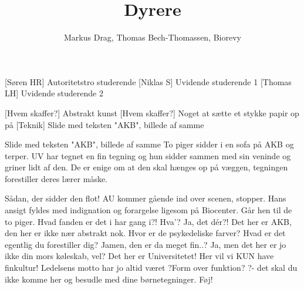 \documentclass[a4paper,12pt]{article}
\title{Dyrere}
\author{Markus Drag, Thomas Bech-Thomassen, Biorevy}
\begin{document}
\maketitle

\begin{texxers}
\end{texxers}

\begin{roles}
	[Søren HR] Autoritetstro studerende
	[Niklas S] Uvidende studerende 1
	[Thomas LH] Uvidende studerende 2
\end{roles}


\begin{props}
	[Hvem skaffer?] Abstrakt kunst
	[Hvem skaffer?] Noget at sætte et stykke papir op på
	[Teknik] Slide med teksten "AKB", billede af samme
\end{props}

\begin{sketch}
Slide med teksten "AKB", billede af samme
\scene To piger sidder i en sofa på AKB og terper. UV har tegnet en fin tegning og hun sidder sammen med sin veninde og griner lidt af den. De er enige om at den skal hænges op på væggen, tegningen forestiller deres lærer måske.



Sådan, der sidder den flot!
\scene AU kommer gående ind over scenen, stopper. Hans ansigt fyldes med indignation og forargelse ligesom på Biocenter. Går hen til de to piger.
 Hvad fanden er det i har gang i?!
Hva'?
 Ja, det dér?! Det her er AKB, den her er ikke nær abstrakt nok. Hvor er de psykedeliske farver? Hvad er det egentlig du forestiller dig?
Jamen, den er da meget fin..?
 Ja, men det her er jo ikke din mors køleskab, vel? Det her er Universitetet! Her vil vi KUN have finkultur! Ledelsens motto har jo altid været ?Form over funktion? ?- det skal du ikke komme her og besudle med dine børnetegninger. Føj! 




\end{sketch}
\end{document}

